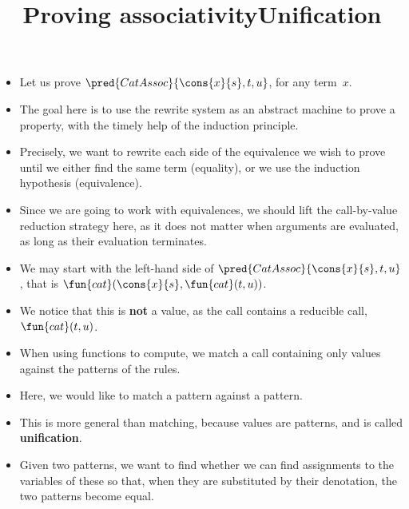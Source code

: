 \documentclass[wide]{slides}
\begin{document}
\begin{slide}
  \title{Proving associativity}

  \begin{itemize}

    \item Let us prove \(\pred{CatAssoc}{\cons{x}{s},t,u}\), for any
      term~\(x\).

    \item The goal here is to use the rewrite system as an abstract
      machine to prove a property, with the timely help of the
      induction principle.

    \item Precisely, we want to rewrite each side of the equivalence
      we wish to prove until we either find the same term (equality),
      or we use the induction hypothesis (equivalence).

    \item Since we are going to work with equivalences, we should lift
      the call\hyp{}by\hyp{}value reduction strategy here, as it does
      not matter when arguments are evaluated, as long as their
      evaluation terminates.

  \end{itemize}

\end{slide}

\begin{slide}
  \title{Unification}

  \begin{itemize}

    \item We may start with the left\hyp{}hand side of
      \(\pred{CatAssoc}{\cons{x}{s},t,u}\), that is
      \(\fun{cat}(\cons{x}{s},\fun{cat}(t,u))\).

    \item We notice that this is \textbf{not} a value, as the call
      contains a reducible call, \(\fun{cat}(t,u)\).

    \item When using functions to compute, we match a call containing
      only values against the patterns of the rules.

    \item Here, we would like to match a pattern against a pattern.

    \item This is more general than matching, because values are
      patterns, and is called \textbf{unification}.

    \item Given two patterns, we want to find whether we can find
      assignments to the variables of these so that, when they are
      substituted by their denotation, the two patterns become equal.

  \end{itemize}

\end{slide}
\end{document}
